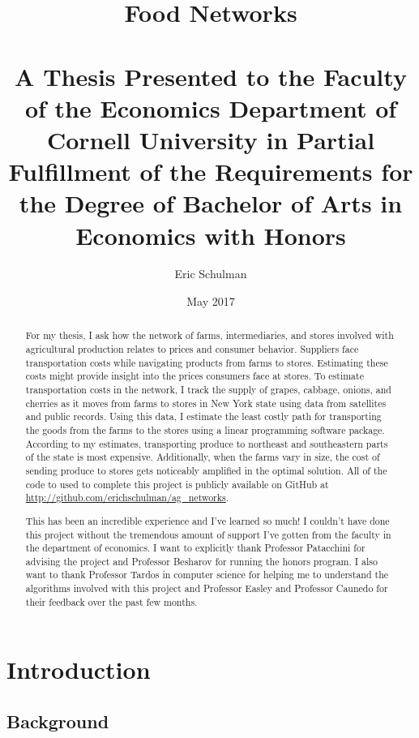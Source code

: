 \documentclass{report}
\title{Food Networks \\~\\ \normalsize A Thesis Presented to the Faculty of the Economics Department of Cornell University in Partial Fulfillment of the Requirements for the Degree of Bachelor of Arts in Economics with Honors}
\author{Eric Schulman}
\date{May 2017}
\begin{document}
\maketitle

\pagebreak

\begin{abstract}
For my thesis, I ask how the network of farms, intermediaries, and stores involved with agricultural production relates to prices and consumer behavior. Suppliers face transportation costs while navigating products from farms to stores. Estimating these costs might provide insight into the prices consumers face at stores. To estimate transportation costs in the network, I track the supply of grapes, cabbage, onions, and cherries as it moves from farms to stores in New York state using data from satellites and public records. Using this data, I estimate the least costly path for transporting the goods from the farms to the stores using a linear programming software package. According to my estimates, transporting produce to northeast and southeastern parts of the state is most expensive. Additionally, when the farms vary in size, the cost of sending produce to stores gets noticeably amplified in the optimal solution. All of the code to used to complete this project is publicly available on GitHub at \url{http://github.com/erichschulman/ag_networks}. 
\end{abstract}

\pagebreak

\renewcommand{\abstractname}{Acknowledgments}
\begin{abstract}
This has been an incredible experience and I've learned so much! I couldn't have done this project without the tremendous amount of support I've gotten from the faculty in the department of economics. I want to explicitly thank Professor Patacchini for advising the project and Professor Besharov for running the honors program. I also want to thank Professor Tardos in computer science for helping me to understand the algorithms involved with this project and Professor Easley and Professor Caunedo for their feedback over the past few months. 
\end{abstract}

\tableofcontents

\chapter{Introduction}
\section{Background}
\end{document}

